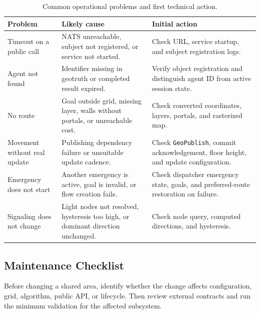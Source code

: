 \documentclass[12pt,a4paper]{report}
\begin{document}
\begin{table}[H]
\centering
\begin{tabular}{|p{}|p{}|p{}|}
\hline
\textbf{Problem} & \textbf{Likely cause} & \textbf{Initial action} \\
\hline
Timeout on a public call &
NATS unreachable, subject not registered, or service not started. &
Check URL, service startup, and subject registration logs. \\
\hline
Agent not found &
Identifier missing in geotruth or completed result expired. &
Verify object registration and distinguish agent ID from active session state. \\
\hline
No route &
Goal outside grid, missing layer, walls without portals, or unreachable cost. &
Check converted coordinates, layers, portals, and rasterized map. \\
\hline
Movement without real update &
Publishing dependency failure or unsuitable update cadence. &
Check \texttt{GeoPublish}, commit acknowledgement, floor height, and update
configuration. \\
\hline
Emergency does not start &
Another emergency is active, goal is invalid, or flow creation fails. &
Check dispatcher emergency state, goals, and preferred-route restoration on
failure. \\
\hline
Signaling does not change &
Light nodes not resolved, hysteresis too high, or dominant direction unchanged. &
Check node query, computed directions, and hysteresis. \\
\hline
\end{tabular}
\caption{Common operational problems and first technical action.}
\end{table}

\subsection{Maintenance Checklist}

Before changing a shared area, identify whether the change affects
configuration, grid, algorithm, public API, or lifecycle. Then review external
contracts and run the minimum validation for the affected subsystem.
\end{document}
